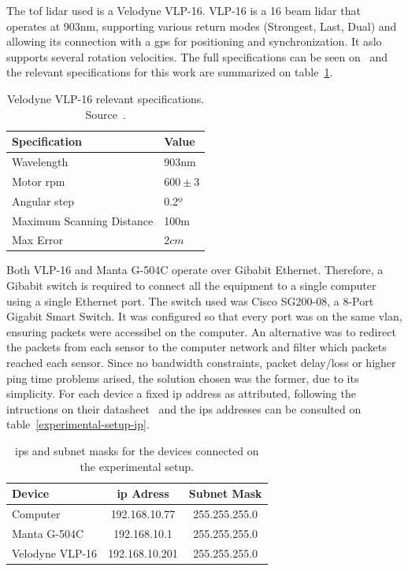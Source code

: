 
The \ac{tof} \ac{lidar} used is a Velodyne VLP-16\texttrademark. VLP-16 is a 16 beam \ac{lidar} that operates at 903nm, supporting various return modes (Strongest, Last, Dual) and allowing its connection with a \ac{gps} for positioning and synchronization. It aslo supports several rotation velocities. The full specifications can be seen on~\cite{VLP16} and the relevant specifications for this work are summarized on table~\ref{tab:vlp16-specs}.

\begin{table}[H]
	\renewcommand{\arraystretch}{1.2}
	\centering
	\begin{tabular}{@{}p{6cm}l@{}}
		\toprule
		Specification & Value \\ \midrule
		Wavelength    & 903nm \\
		Motor \acs{rpm}\footnotemark & $600 \pm 3$ \\
		Angular step & 0.2º \\
		Maximum Scanning Distance & 100m \\
		Max Error & $2 cm$ \\
		\bottomrule
	\end{tabular}
	\caption{Velodyne VLP-16 relevant specifications. Source~\cite{VLP16}.}
	\label{tab:vlp16-specs}
\end{table}


Both VLP-16 and Manta G-504C operate over Gibabit Ethernet. Therefore, a Gibabit switch is required to connect all the equipment to a single computer using a single Ethernet port. The switch used was Cisco SG200-08, a 8-Port Gigabit Smart Switch. It was configured so that every port was on the same \ac{vlan}, ensuring packets were accessibel on the computer. An alternative was to redirect the packets from each sensor to the computer network and filter which packets reached each sensor. Since no bandwidth constraints, packet delay/loss or higher ping time problems arised, the solution chosen was the former, due to its simplicity. For each device a fixed \ac{ip} address as attributed, following the intructions on their datasheet~\cite{VLP16, MantaVision2013} and the \acp{ip} addresses can be consulted on table~\ref{experimental-setup-ip}.

\begin{table}[H]
	\renewcommand{\arraystretch}{1.2}
	\centering
	\begin{tabular}{@{}lcc@{}}
		\toprule
		Device          & \ac{ip} Adress & Subnet Mask\\ \midrule
		Computer        & 192.168.10.77  & 255.255.255.0 \\
		Manta G-504C    & 192.168.10.1   & 255.255.255.0 \\
		Velodyne VLP-16 & 192.168.10.201 & 255.255.255.0 \\
		\bottomrule
	\end{tabular}
	\label{tab:experimental-setup-ip}
	\caption{\acp{ip} and subnet masks for the devices connected on the experimental setup.}
\end{table}

